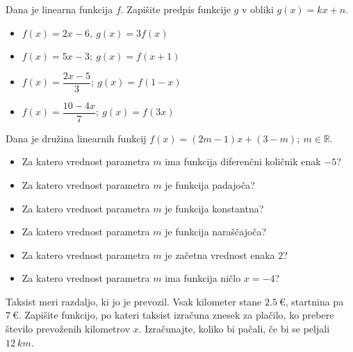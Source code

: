         
            \begin{naloga}
                Dana je linearna funkcija $f$. Zapišite predpis funkcije $g$ v obliki $g(x)=kx+n$.
                    \begin{itemize}
                        \item $f(x)=2x-6, ~ g(x)=3f(x)$ 
                        \item $f(x)=5x-3; ~ g(x)=f(x+1)$ 
                        \item $f(x)=\dfrac{2x-5}{3}; ~ g(x)=f(1-x)$ 
                        \item $f(x)=\dfrac{10-4x}{7}; ~ g(x)=f(3x)$ 
                    \end{itemize}
            \end{naloga}
        


        
            \begin{naloga}
                Dana je družina linearnih funkcij $f(x)=(2m-1)x+(3-m); ~m\in\mathbb{R}$.
                    \begin{itemize}
                        \item Za katero vrednost parametra $m$ ima funkcija diferenčni količnik enak $-5$? 
                        \item Za katero vrednost parametra $m$ je funkcija padajoča?
                        \item Za katero vrednost parametra $m$ je funkcija konstantna? 
                        \item Za katero vrednost parametra $m$ je funkcija naraščajoča? 
                        \item Za katero vrednost parametra $m$ je začetna vrednost enaka $2$? 
                        \item Za katero vrednost parametra $m$ ima funkcija ničlo $x=-4$? 
                    \end{itemize}
            \end{naloga}
        


        
            \begin{naloga}
                Taksist meri razdaljo, ki jo je prevozil. Vsak kilometer stane $2.5~€$, startnina pa $7~€$.
                Zapišite funkcijo, po kateri taksist izračuna znesek za plačilo, ko prebere število prevoženih kilometrov $x$. 
                Izračunajte, koliko bi pačali, če bi se peljali $12~km$. 
            \end{naloga}

